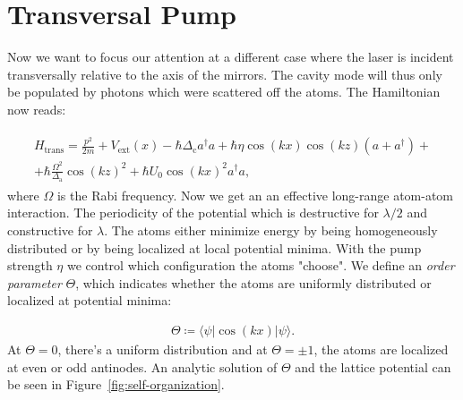 \section{Transversal Pump}

Now we want to focus our attention at a different case where the laser is incident transversally relative to the axis of the mirrors. The cavity mode will thus only be populated by photons which were scattered off the atoms. The Hamiltonian now reads:

\begin{align}
\begin{split}
H_\text{trans} = \frac{p^2}{2m} + V_\text{ext}(x) - \hbar \Delta_\text{c} a^\dagger a  + \hbar \eta \cos(kx) \cos(kz) (a + a^\dagger) + \\
+ \hbar \frac{\Omega^2}{\Delta_\text{a}} \cos(kz)^2 + \hbar U_0 \cos(kx)^2 a^\dagger a,
\end{split}
\end{align}where $\Omega$ is the Rabi frequency. Now we get an an effective long-range atom-atom interaction. The periodicity of the potential which is destructive for $\lambda / 2$ and constructive for $\lambda$. The atoms either minimize energy by being homogeneously distributed or by being localized at local potential minima. With the pump strength $\eta$ we control which configuration the atoms "choose". We define an \textit{order parameter} $\Theta$, which indicates whether the atoms are uniformly distributed or localized at potential minima:

\begin{align}
\Theta \coloneqq \langle \psi | \cos(kx) | \psi \rangle.
\end{align}At $\Theta = 0$, there's a uniform distribution and at $\Theta = \pm 1$, the atoms are localized at even or odd antinodes. An analytic solution of $\Theta$ and the lattice potential can be seen in Figure~\ref{fig:self-organization}.


